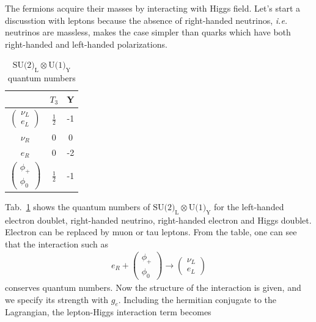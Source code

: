 The fermions acquire their masses by interacting with Higgs field. 
Let's start a discusstion with leptons because the absence of right-handed neutrinos, 
\textit{i.e.} neutrinos are massless, makes the case simpler than quarks which 
have both right-handed and left-handed polarizations. 
\begin{table}[htb] 
\centering
\begin{tabular}{c c c}
\hline 
      & $T_3$ & Y \\
\hline \hline 
$\left(  \begin{array}{c} \nu_L \\ e_L \end{array} \right)$      & $\displaystyle  \frac{1}{2} $ & -1 \\
$ \nu_{R}$                                                      & 0 & 0 \\
$ e_R$                                                           & 0 & -2 \\
$\left(  \begin{array}{c} \phi_+  \\ \phi_0 \end{array} \right)$      & $\displaystyle  \frac{1}{2} $ & -1 \\
\hline 
\end{tabular}
\label{tab:su2Qnum}
\caption{$\textrm{SU(2)}_\textrm{L} \otimes \textrm{U(1)}_\textrm{Y}$ quantum numbers}
\end{table}
Tab.~\ref{tab:su2Qnum} shows the quantum numbers of  
$\textrm{SU(2)}_\textrm{L} \otimes \textrm{U(1)}_\textrm{Y}$
for the left-handed electron doublet, right-handed neutrino, right-handed electron and 
Higgs doublet. Electron can be replaced by muon or tau leptons. 
From the table, one can see that the interaction such as 
\begin{eqnarray} 
e_R + \left(  \begin{array}{c} \phi_+  \\ \phi_0 \end{array} \right) 
\rightarrow 
\left(  \begin{array}{c} \nu_L \\ e_L \end{array} \right)
\end{eqnarray} 
conserves quantum numbers. Now the structure of the interaction is given, and
we specify its strength with $g_e$. Including the hermitian conjugate 
to the Lagrangian, the lepton-Higgs interaction term becomes 
